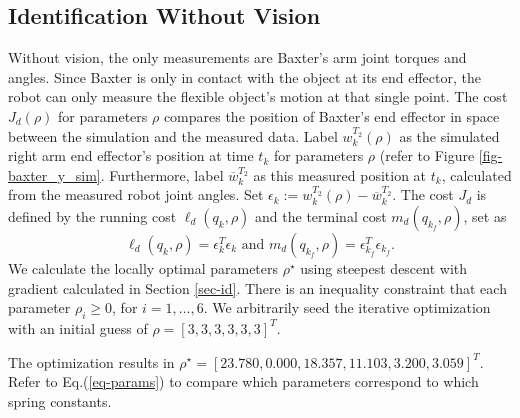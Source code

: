 \documentclass[runningheads,a4paper]{llncs}
\begin{document}
\subsection{Identification Without Vision \label{sec-no_vis}}
Without vision, the only measurements are Baxter's arm joint torques and angles.  Since Baxter is only in contact with the object at its end effector, the robot can only measure the flexible object's motion at that single point. The cost $J_d(\rho)$ for parameters $\rho$ compares the position of Baxter's end effector in space between the simulation and the measured data.  Label $w^{T_2}_k(\rho)$ as the simulated right arm end effector's position at time $t_k$ for parameters $\rho$ (refer to Figure \ref{fig-baxter_y_sim}. Furthermore, label $\overline{w}^{T_2}_k$ as this measured position at $t_k$, calculated from the measured robot joint angles.  Set $\epsilon_k := w^{T_2}_k(\rho)-\overline{w}^{T_2}_k$.  The cost $J_d$ is defined by the running cost $\ell_d(q_k,\rho)$ and the terminal cost $m_d(q_{k_f},\rho)$, set as
\[
\ell_d(q_k,\rho) = \epsilon_k^T\epsilon_k \textrm{ and } m_d(q_{k_f},\rho) = \epsilon_{k_f}^T\epsilon_{k_f}.
\]
We calculate the locally optimal parameters $\rho^\star$ using steepest descent with gradient calculated in Section \ref{sec-id}. There is an inequality constraint that each parameter $\rho_i\geq 0$, for $i = 1,\ldots,6$. We arbitrarily seed the iterative optimization with an initial guess of $\rho = [3, 3, 3, 3, 3, 3]^T$.  %

The optimization results in $\rho^\star = [23.780,  0.000 , 18.357 , 11.103 , 3.200,  3.059]^T$. Refer to Eq.(\ref{eq-params}) to compare which parameters correspond to which spring constants. 
\end{document}
